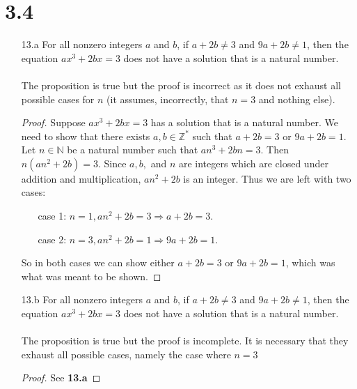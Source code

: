 \documentclass[]{article}
\begin{document}
\section*{3.4}
\begin{itemize}
	\item[13.a] For all nonzero integers $a$ and $b$, if $a + 2b \neq 3$ and $9a+2b \neq 1$, then the equation $ax^3 + 2bx = 3$ does not have a solution that is a natural number. \\
	\\ 
	The proposition is true but the proof is incorrect as it does not exhaust all possible cases for $n$ (it assumes, incorrectly, that $n = 3$ and nothing else).
\begin{proof}
	Suppose $ax^3 + 2bx = 3$ has a solution that is a natural number. We need to show that there exists $a, b \in \mathbb{Z^*}$ such that $a + 2b = 3$ or $9a + 2b = 1$. Let $n \in \mathbb{N}$ be a natural number such that $an^3 + 2bn = 3$. Then $n(an^2 + 2b) = 3$. Since $a, b,$ and $n$ are integers which are closed under addition and multiplication, $an^2 + 2b$ is an integer. Thus we are left with two cases:
	\begin{itemize}
		\item[case 1:] $n = 1, an^2 + 2b = 3 \Rightarrow a + 2b = 3$.
		\item[case 2:] $n = 3, an^2 + 2b = 1 \Rightarrow 9a + 2b = 1.$
	\end{itemize}
	So in both cases we can show either $a + 2b = 3$ or $9a + 2b = 1$, which was what was meant to be shown.
\end{proof}
	\item[13.b] For all nonzero integers $a$ and $b$, if $a + 2b \neq 3$ and $9a+2b \neq 1$, then the equation $ax^3 + 2bx = 3$ does not have a solution that is a natural number. \\
	\\
	The proposition is true but the proof is incomplete. It is necessary that they exhaust all possible cases, namely the case where $n = 3$
	\begin{proof}
		See \textbf{13.a}
	\end{proof}
\end{itemize}
\end{document}
